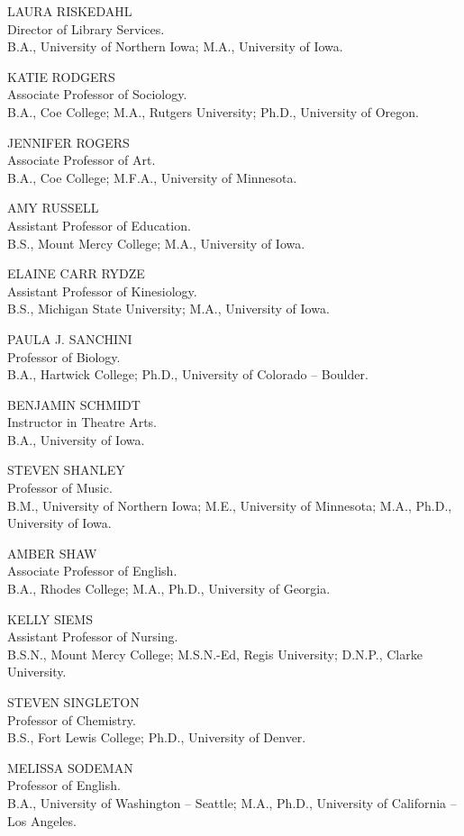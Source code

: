 \documentclass[
  letterpaper,
]{scrbook}
\begin{document}
LAURA RISKEDAHL\\
Director of Library Services.\\
B.A., University of Northern Iowa; M.A., University of Iowa.

KATIE RODGERS\\
Associate Professor of Sociology.\\
B.A., Coe College; M.A., Rutgers University; Ph.D., University of
Oregon.

JENNIFER ROGERS\\
Associate Professor of Art.\\
B.A., Coe College; M.F.A., University of Minnesota.

AMY RUSSELL\\
Assistant Professor of Education.\\
B.S., Mount Mercy College; M.A., University of Iowa.

ELAINE CARR RYDZE\\
Assistant Professor of Kinesiology.\\
B.S., Michigan State University; M.A., University of Iowa.

PAULA J. SANCHINI\\
Professor of Biology.\\
B.A., Hartwick College; Ph.D., University of Colorado -- Boulder.

BENJAMIN SCHMIDT\\
Instructor in Theatre Arts.\\
B.A., University of Iowa.

STEVEN SHANLEY\\
Professor of Music.\\
B.M., University of Northern Iowa; M.E., University of Minnesota; M.A.,
Ph.D., University of Iowa.

AMBER SHAW\\
Associate Professor of English.\\
B.A., Rhodes College; M.A., Ph.D., University of Georgia.

KELLY SIEMS\\
Assistant Professor of Nursing.\\
B.S.N., Mount Mercy College; M.S.N.-Ed, Regis University; D.N.P., Clarke
University.

STEVEN SINGLETON\\
Professor of Chemistry.\\
B.S., Fort Lewis College; Ph.D., University of Denver.

MELISSA SODEMAN\\
Professor of English.\\
B.A., University of Washington -- Seattle; M.A., Ph.D., University of
California -- Los Angeles.
\end{document}
